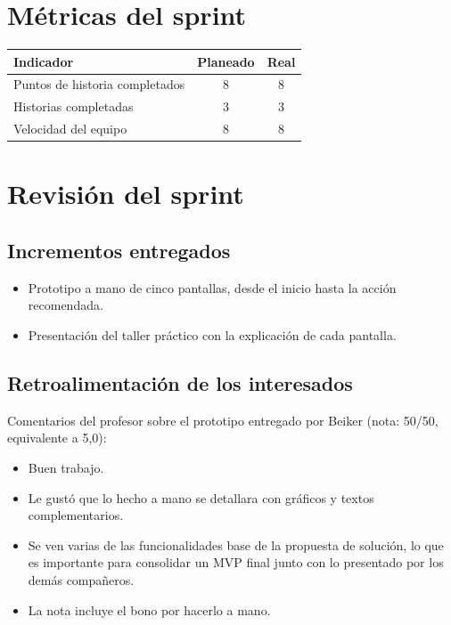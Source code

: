 \documentclass[11pt,a4paper]{article}
\begin{document}
\section{Métricas del sprint}

\begin{tabularx}{\textwidth}{X c c}
  \toprule
  \textbf{Indicador} & \textbf{Planeado} & \textbf{Real} \\
  \midrule
  Puntos de historia completados & 8 & 8 \\
  Historias completadas          & 3 & 3 \\
  Velocidad del equipo           & 8 & 8 \\
  \bottomrule
\end{tabularx}

\section{Revisión del sprint}

\subsection{Incrementos entregados}
\begin{itemize}[leftmargin=1.5em]
  \item {Prototipo a mano de cinco pantallas, desde el inicio hasta la acción recomendada.}
  \item {Presentación del taller práctico con la explicación de cada pantalla.}
\end{itemize}

\subsection{Retroalimentación de los interesados}
{Comentarios del profesor sobre el prototipo entregado por Beiker (nota: 50/50, equivalente a 5,0):}
\begin{itemize}[leftmargin=1.5em]
  \item {Buen trabajo.}
  \item {Le gustó que lo hecho a mano se detallara con gráficos y textos complementarios.}
  \item {Se ven varias de las funcionalidades base de la propuesta de solución, lo que es importante para consolidar un MVP final junto con lo presentado por los demás compañeros.}
  \item {La nota incluye el bono por hacerlo a mano.}
\end{itemize}
\end{document}
